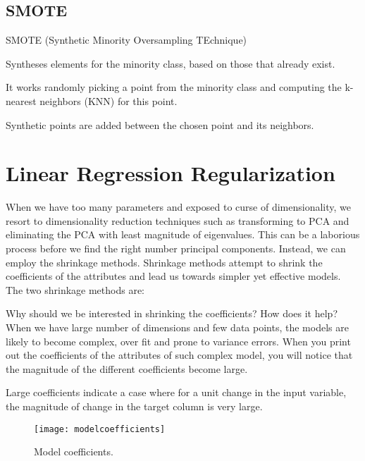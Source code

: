 	\subsection{SMOTE}
SMOTE (Synthetic Minority Oversampling TEchnique)
	\begin{bulletedlist}
		\item Syntheses elements for the minority class, based on those that already exist.
		\item It works randomly picking a point from the minority class and computing the k-nearest neighbors (KNN) for this point.
		\item Synthetic points are added between the chosen point and its neighbors.
	\end{bulletedlist}


	\section{Linear Regression Regularization}

When we have too many parameters and exposed to curse of dimensionality, we resort to dimensionality reduction techniques such as transforming to PCA and eliminating the PCA with least magnitude of eigenvalues. This can be a laborious process before we find the right number principal components. Instead, we can employ the shrinkage methods.  Shrinkage methods attempt to shrink the coefficients of the attributes and lead us towards simpler yet effective models. The two shrinkage methods are:

Why should we be interested in shrinking the coefficients? How does it help?  When we have large number of dimensions and few data points, the models are likely to become complex, over fit and prone to variance errors. When you print out the coefficients of the attributes of such complex model, you will notice that the magnitude of the different coefficients become large.

Large coefficients indicate a case where for a unit change in the input variable, the magnitude of change in the target column is very large.

	\begin{figure}[tbh]
		\centering
		\texttt{[image: modelcoefficients]}
		\caption[Model coefficients]{Model coefficients.}
		\label{fig:modelcoefficients}
	\end{figure}

